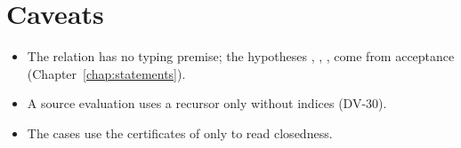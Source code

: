 \section*{Caveats}
\begin{itemize}
\item The relation has no typing premise; the hypotheses , , ,  come from acceptance (Chapter~\ref{chap:statements}).
\item A source evaluation uses a recursor only without indices (DV-30).
\item The cases use the certificates of  only to read closedness.
\end{itemize}
